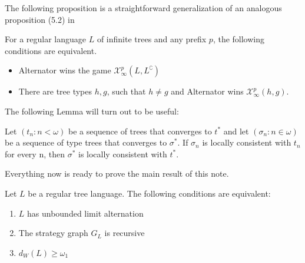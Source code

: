 The following proposition is a straightforward generalization of an analogous proposition (5.2) in \cite{bp}

\begin{proposition}\label{prop:tree_to_types}
 For a regular language $L$ of infinite trees and any prefix $p$, the following conditions are equivalent.
 \begin{itemize}
\item Alternator wins the game $\mathcal{X}^p_\infty(L, L^\complement)$ 
 \item  There are tree types $h, g$, such that $h\neq g$ and Alternator wins $\mathcal{X}^p_\infty(h, g)$.
 \end{itemize}
\end{proposition}

The following Lemma will turn out to be useful:

\begin{lemma}\label{lemma:limit}
Let $(t_n: n <\omega)$ be a sequence of trees that converges to $t^*$ and let $(\sigma_n: n \in \omega)$ be a sequence of type trees that converges to $\sigma^*$. If $\sigma_n$ is locally consistent with $t_n$ for every n, then $\sigma^*$ is locally consistent with $t^*$.
\end{lemma}

Everything now is ready to prove the main result of this note.

\begin{theorem}
Let $L$ be a regular tree language. The following conditions are equivalent:
\begin{enumerate}



\item $L$ has unbounded limit alternation
\item The strategy graph $G_L$ is recursive
\item $d_W(L) \geq \omega_1$



\end{enumerate}
\end{theorem}

